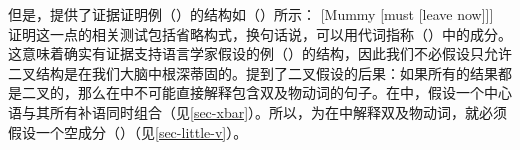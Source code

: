 \noindent
但是，\citet[]{Haegeman94a-u}提供了证据证明例（）的结构如（）所示：
\ea
{}[Mummy [must [leave now]]]
\z
证明这一点的相关测试包括省略构式，换句话说，可以用代词指称（）中的成分。这意味着确实有证据支持语言学家假设的例（）的结构，因此我们不必假设只允许二叉结构是在我们大脑中根深蒂固的。\citet[]{Haegeman94a-u}提到了二叉假设的后果：如果所有的结果都是二叉的，那么在\xbartc 中不可能直接解释包含双及物动词的句子。在\xbartc 中，假设一个中心语与其所有补语同时组合（见\ref{sec-xbar}）。所以，为在\xbartc 中解释双及物动词，就必须假设一个空成分（\littlevc ）（见\ref{sec-little-v}）。

